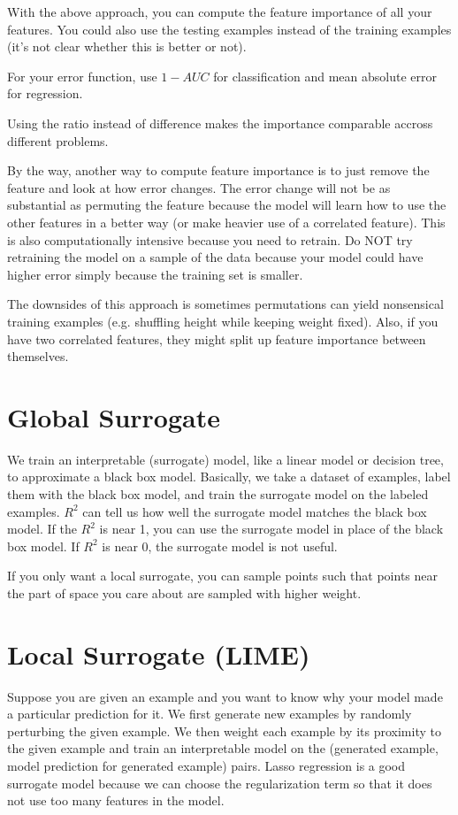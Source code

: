 \documentclass[a4paper]{article}
\begin{document}
With the above approach, you can compute the feature importance of all your
features. You could also use the testing examples instead of the training
examples (it's not clear whether this is better or not).

For your error function, use $1 - AUC$ for classification and mean absolute
error for regression.

Using the ratio instead of difference makes the importance comparable accross
different problems.

By the way, another way to compute feature importance is to just remove the
feature and look at how error changes. The error change will not be as
substantial as permuting the feature because the model will learn how to use the
other features in a better way (or make heavier use of a correlated feature). This
is also computationally intensive because
you need to retrain. Do NOT try retraining the model on a sample of the data
because your model could have higher error simply because the training set is
smaller.

The downsides of this approach is sometimes permutations can yield nonsensical
training examples (e.g. shuffling height while keeping weight fixed). Also,
if you have two correlated features, they might split up feature importance
between themselves.

\section{Global Surrogate}
We train an interpretable (surrogate) model, like a linear model or
decision tree, to approximate a black box model. Basically, we take a dataset
of examples, label them with the black box model, and train the surrogate model
on the labeled examples. $R^2$ can tell us how well the surrogate model matches
the black box model. If the $R^2$ is near 1, you can use the surrogate model
in place of the black box model. If $R^2$ is near 0, the surrogate model is
not useful.

If you only want a local surrogate, you can sample points such that points
near the part of space you care about are sampled with higher weight.

\section{Local Surrogate (LIME)}
Suppose you are given an example and you want to know why your model made a
particular prediction for it. We first generate new examples by randomly
perturbing the given example. We then weight each example by its proximity
to the given example and train an interpretable model on the (generated
example, model prediction for generated example) pairs. Lasso regression is a
good surrogate model because we can choose the regularization term so that it
does not use too many features in the model.
\end{document}
